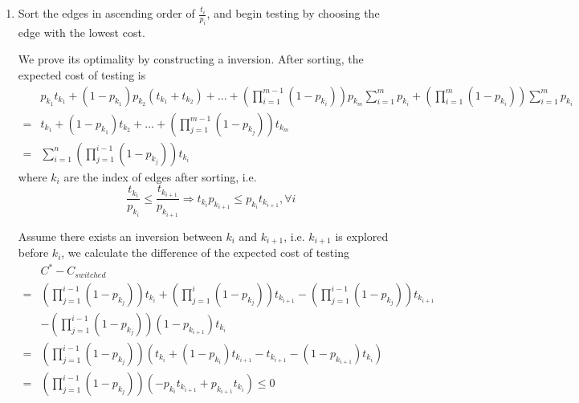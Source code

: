 \documentclass{oxmathproblems}
\begin{document}
\begin{enumerate}
{    Rule 3 is not actually applied since our graph is simple.

  }
  \item {
    Sort the edges in ascending order of $\frac{t_i}{p_i}$, and begin testing by choosing the edge with the lowest cost.

    We prove its optimality by constructing a inversion. After sorting, the expected cost of testing is
    \begin{equation}
      \begin{aligned}
        &p_{k_1}t_{k_1} + (1 - p_{k_1}) p_{k_2} (t_{k_1} + t_{k_2}) + \ldots + \left(\prod_{i=1}^{m-1} (1-p_{k_{i}})\right)p_{k_m}\sum_{i=1}^{m}p_{k_i} + \left(\prod_{i=1}^{m} (1-p_{k_{i}})\right)\sum_{i=1}^{m}p_{k_i} \\
        =& t_{k_1} + (1-p_{k_1})t_{k_2} + \ldots + \left(\prod_{j=1}^{m-1}(1-p_{k_j})\right)t_{k_m} \\
        =& \sum_{i=1}^{n} \left(\prod_{j=1}^{i-1}(1-p_{k_j})\right)t_{k_i} 
      \end{aligned}
    \end{equation}
    where $k_i$ are the index of edges after sorting, i.e.
    \begin{equation}
      \frac{t_{k_i}}{p_{k_i}} \le \frac{t_{k_{i+1}}}{p_{k_{i+1}}} \Rightarrow t_{k_i}p_{k_{i+1}} \le p_{k_i}t_{k_{i+1}}, \forall i
    \end{equation}

    Assume there exists an inversion between $k_i$ and $k_{i+1}$, i.e. $k_{i+1}$ is explored before $k_i$, we calculate the difference of the expected cost of testing
    \begin{equation}
      \begin{aligned}
        &C^{*} - C_{switched} \\
        = &\left(\prod_{j=1}^{i-1}(1-p_{k_j})\right)t_{k_i} + \left(\prod_{j=1}^{i}(1-p_{k_j})\right)t_{k_{i+1}} - \left(\prod_{j=1}^{i-1}(1-p_{k_j})\right)t_{k_{i+1}} \\
        & - \left(\prod_{j=1}^{i-1}(1-p_{k_j})\right)(1-p_{k_{i+1}}) t_{k_{i}} \\
        = & \left(\prod_{j=1}^{i-1}(1-p_{k_j})\right) \left(t_{k_i} + (1-p_{k_{i}})t_{k_{i+1}} - t_{k_{i+1}} - (1-p_{k_{i+1}})t_{k_i} \right) \\
        = & \left(\prod_{j=1}^{i-1}(1-p_{k_j})\right) \left(-p_{k_{i}}t_{k_{i+1}} + p_{k_{i+1}}t_{k_i} \right) \le 0
      \end{aligned}
    \end{equation}

}
\end{enumerate}
\end{document}
